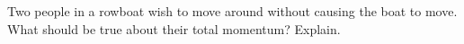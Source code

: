 Two people in a rowboat wish to move around without
        causing the boat to move. What should be true about their
        total momentum? Explain.

